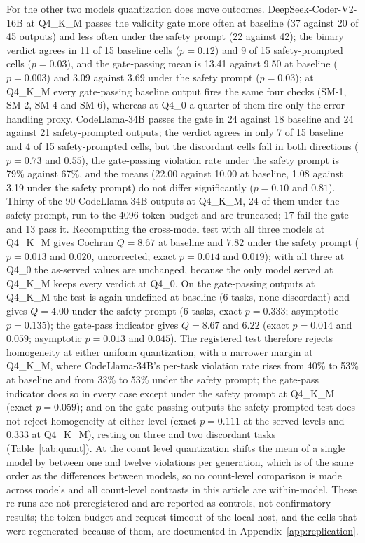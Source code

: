 \documentclass{ieeeaccess}
\begin{document}
For the other two models quantization does move outcomes. DeepSeek-Coder-V2-16B at
Q4\_K\_M passes the validity gate more often at baseline (37 against 20 of 45 outputs) and
less often under the safety prompt (22 against 42); the binary verdict agrees in 11 of 15
baseline cells ($p = 0.12$) and 9 of 15 safety-prompted cells ($p = 0.03$), and the
gate-passing mean is 13.41 against 9.50 at baseline ($p = 0.003$) and 3.09 against 3.69
under the safety prompt ($p = 0.03$); at Q4\_K\_M every gate-passing baseline output fires
the same four checks (SM-1, SM-2, SM-4 and SM-6), whereas at Q4\_0 a quarter of them fire
only the error-handling proxy. CodeLlama-34B passes the gate in 24 against 18 baseline and
24 against 21 safety-prompted outputs; the verdict agrees in only 7 of 15 baseline and 4 of
15 safety-prompted cells, but the discordant cells fall in both directions ($p = 0.73$ and
$0.55$), the gate-passing violation rate under the safety prompt is 79\% against 67\%, and
the means (22.00 against 10.00 at baseline, 1.08 against 3.19 under the safety prompt) do
not differ significantly ($p = 0.10$ and $0.81$). Thirty of the 90 CodeLlama-34B outputs at
Q4\_K\_M, 24 of them under the safety prompt, run to the 4096-token budget and are
truncated; 17 fail the gate and 13 pass it. Recomputing the cross-model test with all
three models at Q4\_K\_M gives Cochran $Q = 8.67$ at baseline and $7.82$ under the safety
prompt ($p = 0.013$ and $0.020$, uncorrected; exact $p = 0.014$ and $0.019$); with all three
at Q4\_0 the as-served
values are unchanged, because the only model served at Q4\_K\_M keeps every verdict at
Q4\_0. On the gate-passing outputs at Q4\_K\_M the test is again undefined at baseline (6
tasks, none discordant) and gives $Q = 4.00$ under the safety prompt (6 tasks, exact
$p = 0.333$; asymptotic $p = 0.135$); the gate-pass indicator gives $Q = 8.67$ and $6.22$
(exact $p = 0.014$ and $0.059$; asymptotic $p = 0.013$ and $0.045$). The registered test therefore rejects homogeneity at either uniform
quantization, with a narrower margin at Q4\_K\_M, where CodeLlama-34B's per-task violation
rate rises from 40\% to 53\% at baseline and from 33\% to 53\% under the safety prompt;
the gate-pass indicator does so in every case except under the safety prompt at Q4\_K\_M
(exact $p = 0.059$); and on the gate-passing outputs the safety-prompted test does not reject
homogeneity at either level (exact $p = 0.111$ at the served levels and $0.333$ at
Q4\_K\_M), resting on three and two discordant tasks (Table~\ref{tab:quant}). At the count level quantization shifts the mean of a
single model by between one and twelve violations per generation, which is of the same
order as the differences between models, so no count-level comparison is made across
models and all count-level contrasts in this article are within-model. These re-runs are
not preregistered and are reported as controls, not confirmatory results; the token
budget and request timeout of the local host, and the cells that were regenerated because
of them, are documented in Appendix~\ref{app:replication}.
\end{document}

